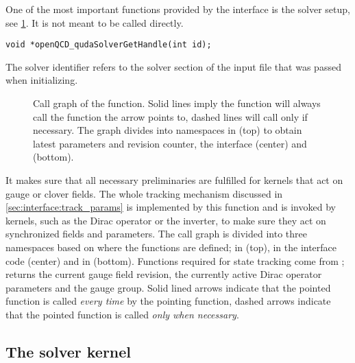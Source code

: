 One of the most important functions provided by the interface is the solver setup, see \cref{fig:call_graph}.
It is not meant to be called directly.
\begin{verbatim}
void *openQCD_qudaSolverGetHandle(int id);
\end{verbatim}
The solver identifier refers to the solver section of the input file that was passed when initializing.
\begin{figure}
  
  \caption{Call graph of the  function. Solid lines imply the function will always call the function the arrow points to, dashed lines will call only if necessary. The graph divides into namespaces in \openqxd (top) to obtain latest parameters and revision counter, the interface (center) and \quda (bottom).}
  \label{fig:call_graph}
\end{figure}
It makes sure that all necessary preliminaries are fulfilled for kernels that act on gauge or clover fields.
The whole tracking mechanism discussed in \cref{sec:interface:track_params} is implemented by this function and is invoked by kernels, such as the Dirac operator or the inverter, to make sure they act on synchronized fields and parameters.
The call graph is divided into three namespaces based on where the functions are defined; in \openqxd (top), in the interface code (center) and in \quda (bottom).
Functions required for state tracking come from \openqxd;  returns the current gauge field revision,  the currently active Dirac operator parameters and  the gauge group.
Solid lined arrows indicate that the pointed function is called \emph{every time} by the pointing function, dashed arrows indicate that the pointed function is called \emph{only when necessary}.

\subsection{The solver kernel}
\label{sec:interface:solver:simple}


